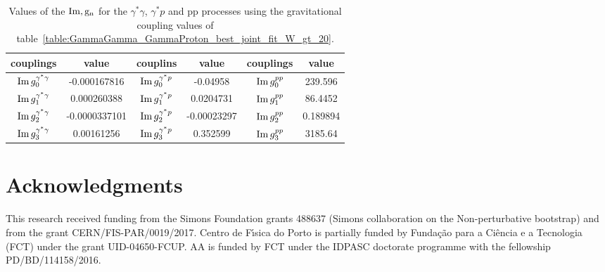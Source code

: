 \documentclass[preprint, 12pt]{elsarticle}
\begin{document}
\begin{table}[b!]
\centering
\caption{Values of the $\rm{Im} , g_n$ for the $\gamma^* \gamma$, $\gamma^* p$ and pp processes using the gravitational coupling values of table~\ref{table:GammaGamma_GammaProton_best_joint_fit_W_gt_20}.}
\vspace{0.5cm}
\begin{tabular}{|c|c|c|c|c|c|}
\hline
couplings   & value & couplins & value & couplings & value \\
\hline
${\rm Im} \, g_0^{\gamma^*\gamma}$  & -0.000167816 & ${\rm Im} \, g_0^{\gamma^*p}$ & -0.04958 & ${\rm Im} \, g_0^{pp}$ & 239.596 \\ 
\hline
${\rm Im} \, g_1^{\gamma^*\gamma}$  & 0.000260388 & ${\rm Im} \, g_1^{\gamma^*p}$ & 0.0204731 & ${\rm Im} \, g_1^{pp}$ & 86.4452 \\ 
\hline
${\rm Im} \, g_2^{\gamma^*\gamma}$  & -0.0000337101 & ${\rm Im} \, g_2^{\gamma^*p}$ & -0.00023297 & ${\rm Im} \, g_2^{pp}$ & 0.189894 \\ 
\hline
${\rm Im} \, g_3^{\gamma^*\gamma}$  & 0.00161256 & ${\rm Im} \, g_3^{\gamma^*p}$ & 0.352599 & ${\rm Im} \, g_3^{pp}$ & 3185.64 \\ 
\hline
\end{tabular}
\label{table:Im_gn_vals_2}
\end{table}


\section{Acknowledgments}


This research received funding from the Simons Foundation grants 488637  (Simons collaboration on the Non-perturbative bootstrap)
and from the  grant CERN/FIS-PAR/0019/2017. 
Centro de F\'\i sica do Porto is partially funded by Funda\c c\~ao para a Ci\^encia e a Tecnologia (FCT) under the grant
UID-04650-FCUP.
 AA is funded by FCT under the IDPASC doctorate programme with the fellowship  PD/BD/114158/2016.



\end{document}
